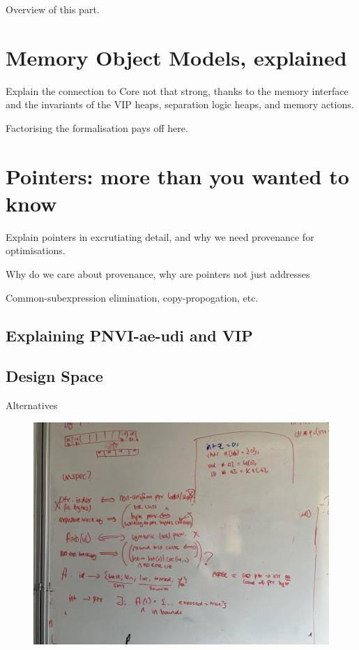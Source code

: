 Overview of this part.

\chapter{Memory Object Models, explained}\label{chap:mem-model-explained}

Explain the connection to Core \emdash{} not that strong, thanks to the memory
interface and the invariants of the VIP heaps, separation logic heaps, and
memory actions.

Factorising the formalisation pays off here.

\chapter{Pointers: more than you wanted to know}

Explain pointers in excrutiating detail, and why we need provenance for
optimisations.

Why do we care about provenance, why are pointers not just addresses

Common-subexpression elimination, copy-propogation, etc.

\section{Explaining PNVI-ae-udi and VIP}

\section{Design Space}

Alternatives

\begin{figure}[h]
    \centering
    \includegraphics[width=\textwidth]{../misc/type-system-options.jpg}
\end{figure}


